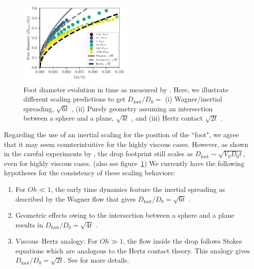 \documentclass[]{article}
\begin{document}
\begin{enumerate}
\begin{enumerate}
		\begin{figure}
			\centering
			\includegraphics[width=0.5\textwidth]{TestPlot/foot.pdf}
			\caption{Foot diameter evolution in time as measured by \citet{langley2017impact}. Here, we illustrate different scaling predictions to get $D_{\text{foot}}/D_0 = $ (i) Wagner/inertial spreading, $\sqrt{6t}$ \citep{wagner1932stoss, Philippi2016, gordillo2019theory}, (ii) Purely geometry assuming an intersection between a sphere and a plane, $\sqrt{4t}$ \citep{zheng2021air, bilotto2023fluid}, and (iii) Hertz contact $\sqrt{2t}$ \citep{bertin2023similarity, bilotto2023fluid}.}
			\label{fig:sqrt}
		\end{figure}
		
		Regarding the use of an inertial scaling for the position of the ``foot", we agree that it may seem counterintuitive for the highly viscous cases. However, as shown in the careful experiments by \citet{langley2017impact}, the drop footprint still scales as $D_{\text{foot}} \sim \sqrt{V_0D_0t}$, even for highly viscous cases. (also see figure~\ref{fig:sqrt}) We currently have the following hypotheses for the consistency of these scaling behaviors:
		
		\begin{enumerate}
			\item For $Oh \ll 1$, the early time dynamics feature the inertial spreading as described by the Wagner flow that gives $D_{\text{foot}}/D_0 = \sqrt{6t}$ \citep{wagner1932stoss, Philippi2016, gordillo2019theory}.
			\item Geometric effects owing to the intersection between a sphere and a plane results in $D_{\text{foot}}/D_0 = \sqrt{4t}$ \citep{zheng2021air, bilotto2023fluid}.
			\item Viscous--Hertz analogy: For $Oh \gg 1$, the flow inside the drop follows Stokes equations which are analogous to the Hertz contact theory. This analogy gives $D_{\text{foot}}/D_0 = \sqrt{2t}$. See \citet{bertin2023similarity, bilotto2023fluid} for more details. 
		\end{enumerate}
		

\end{enumerate}
\end{enumerate}
\end{document}
